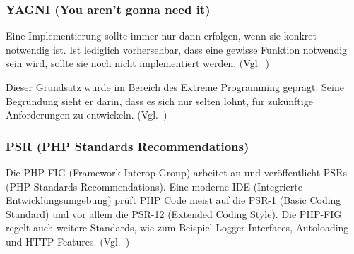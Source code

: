 \subsubsection{YAGNI (You aren't gonna need it)}
Eine Implementierung sollte immer nur dann erfolgen, wenn sie konkret notwendig ist.
Ist lediglich vorhersehbar, dass eine gewisse Funktion notwendig sein wird, sollte sie noch nicht implementiert werden.
(Vgl.~\cite{extreme-programming-installed})

Dieser Grundsatz wurde im Bereich des Extreme Programming geprägt.
Seine Begründung sieht er darin, dass es sich nur selten lohnt, für zukünftige Anforderungen zu entwickeln.
(Vgl.~\cite{kiss-principle-explained})

\subsubsection{PSR (PHP Standards Recommendations)}
Die PHP FIG (Framework Interop Group) arbeitet an und veröffentlicht PSRs (PHP Standards Recommendations).
Eine moderne IDE (Integrierte Entwicklungsumgebung) prüft PHP Code meist auf die PSR-1 (Basic Coding Standard) und vor allem die PSR-12 (Extended Coding Style).
Die PHP-FIG regelt auch weitere Standards, wie zum Beispiel Logger Interfaces, Autoloading und HTTP Features.
(Vgl.~\cite{psr})
